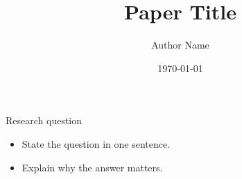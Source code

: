 \documentclass[12pt,aspectratio=169]{beamer}
\title[Short title]{Paper Title}
\author[Author name]{Author Name}
\institute[]{Institution}
\date{\today}
\begin{document}
\begin{frame}[plain]
    \titlepage
\end{frame}

\begin{frame}{Research question}
    \begin{itemize}
        \item State the question in one sentence.
        \medskip
        \item Explain why the answer matters.
    \end{itemize}
\end{frame}
\end{document}
